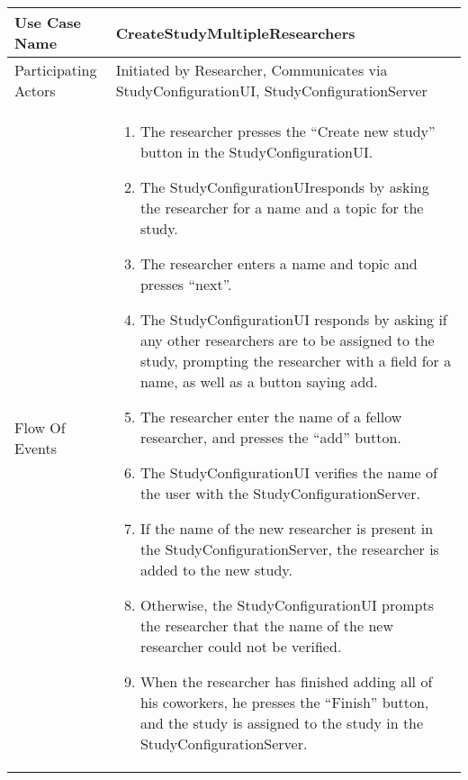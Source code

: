 \begin{center}
	\begin{tabular}{ | l | p{10cm} |} \hline
	    Use Case Name & \textbf{CreateStudyMultipleResearchers}\\ \hline
	    Participating Actors &  Initiated by Researcher, Communicates via StudyConfigurationUI, StudyConfigurationServer\\ \hline
	    Flow Of Events &
	    \begin{enumerate}
		    \item The researcher presses the “Create new study” button in the StudyConfigurationUI.
		    \item The StudyConfigurationUIresponds by asking the researcher for a name and a topic for the study.
		    \item The researcher enters a name and topic and presses “next”.
		    \item The StudyConfigurationUI responds by asking if any other researchers are to be assigned to the study, prompting the researcher with a field for a name, as well as a button saying add.
		    \item The researcher enter the name of a fellow researcher, and presses the “add” button.
		    \item The StudyConfigurationUI verifies the name of the user with the StudyConfigurationServer.
		    \item If the name of the new researcher is present in the StudyConfigurationServer, the researcher is added to the new study.
		    \item Otherwise, the StudyConfigurationUI prompts the researcher that the name of the new researcher could not be verified.
		    \item When the researcher has finished adding all of his coworkers, he presses the “Finish” button, and the study is assigned to the study in the StudyConfigurationServer.
		    		    	    

\end{enumerate}
\end{tabular}
\end{center}

